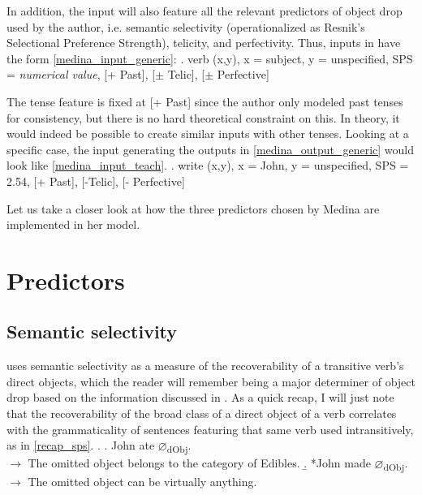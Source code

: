 In addition, the input will also feature all the relevant predictors of object drop used by the author, i.e. semantic selectivity (operationalized as Resnik's Selectional Preference Strength), telicity, and perfectivity. Thus, inputs in \textcite{Medina2007} have the form \ref{medina_input_generic}:
\ex. \label{medina_input_generic} verb (x,y), x = subject, y = unspecified, SPS = \textit{numerical value}, [+ Past], [$\pm$ Telic], [$\pm$ Perfective]

The tense feature is fixed at [+ Past] since the author only modeled past tenses for consistency, but there is no hard theoretical constraint on this. In theory, it would indeed be possible to create similar inputs with other tenses. Looking at a specific case, the input generating the outputs in \ref{medina_output_generic} would look like \ref{medina_input_teach}.
\ex. \label{medina_input_teach} write (x,y), x = John, y = unspecified, SPS = 2.54, [+ Past], [-Telic], [- Perfective]

Let us take a closer look at how the three predictors chosen by Medina are implemented in her model.


\section{Predictors} 

\subsection{Semantic selectivity} \textcite{Medina2007} uses semantic selectivity as a measure of the recoverability of a transitive verb's direct objects, which the reader will remember being a major determiner of object drop based on the information discussed in . As a quick recap, I will just note that the recoverability of the broad class of a direct object of a verb correlates with the grammaticality of sentences featuring that same verb used intransitively, as in \ref{recap_sps}.
\ex. \label{recap_sps} \a. John ate $\varnothing$\textsubscript{dObj}. \\ $\longrightarrow$ The omitted object belongs to the category of Edibles.
\b. *John made $\varnothing$\textsubscript{dObj}. \\ $\longrightarrow$ The omitted object can be virtually anything.

